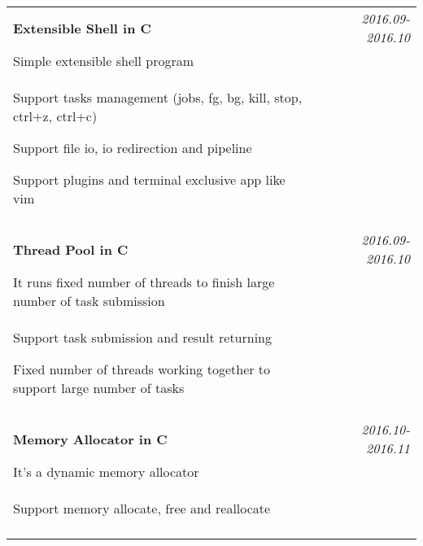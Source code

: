 \documentclass[a4paper,10pt]{article}
\begin{document}
\begin{tabular}{p{13.5cm}p{0.5cm}r}
\textbf{Extensible Shell in C} && \emph{2016.09-2016.10} \\
\hspace{1em} Simple extensible shell program && \vspace{-0.5em} \\
\begin{compactitem}
  \item Support tasks management (jobs, fg, bg, kill, stop, ctrl+z, ctrl+c) \vspace{0.2em}
  \item Support file io, io redirection and pipeline \vspace{0.2em}
  \item Support plugins and terminal exclusive app like vim \vspace{0.2em}  
\end{compactitem}&&\vspace{-2.2em} \\
\multicolumn{3}{c}{} \\


\textbf{Thread Pool in C} && \emph{2016.09-2016.10} \\
\hspace{1em} It runs fixed number of threads to finish large number of task submission && \vspace{-0.5em} \\
\begin{compactitem}
  \item Support task submission and result returning\vspace{0.2em}
  \item Fixed number of threads working together to support large number of tasks
\end{compactitem}&&\vspace{-2.2em} \\
\multicolumn{3}{c}{} \\

\textbf{Memory Allocator in C} && \emph{2016.10-2016.11} \\
\hspace{1em} It's a dynamic memory allocator && \vspace{-0.5em} \\
\begin{compactitem}
  \item Support memory allocate, free and reallocate \vspace{0.2em}
\end{compactitem}&&\vspace{-2.2em} \\
\multicolumn{3}{c}{} \\



\end{tabular}
\end{document}
